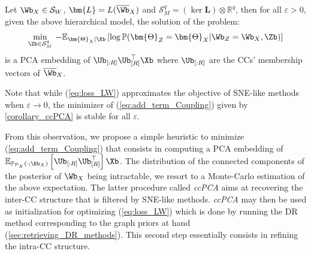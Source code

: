 
\begin{corollary}\label{corollary_ccPCA}
Let $\Wb_{X} \in \mathcal{S}_{W}$, $\bm{L} = L(\overline{\Wb}_{X})$ and $\mathcal{S}^q_{M}= (\ker \bm{L}) \otimes \mathbb{R}^q$, then for all $\varepsilon > 0$, given the above hierarchical model, the solution of the problem:
$$\min_{\Zb \in \mathcal{S}^q_{M}} \: -\mathbb{E}_{\bm{\Theta}_{X}| \Xb}\left[ \log \mathbb{P}(\bm{\Theta}_{Z} = \bm{\Theta}_{X}| \Wb_{Z} = \Wb_{X}, \Zb) \right]$$
is a PCA embedding of $\Ub_{[:R]}\Ub_{[R]}^\top\Xb$ where $\Ub_{[:R]}$ are the CCs' membership vectors of $\overline{\Wb}_{X}$.
\end{corollary}

\begin{remark}
Note that while (\ref{eq:loss_LW}) approximates the objective of SNE-like methods when $\varepsilon \to 0$, the minimizer of (\ref{eq:add_term_Coupling}) given by \cref{corollary_ccPCA} is stable for all $\varepsilon$.
\end{remark}

From this observation, we propose a simple heuristic to minimize (\ref{eq:add_term_Coupling}) that consists in computing a PCA embedding of $\mathbb{E}_{\mathbb{P}_{\mathcal{P}_X}(\cdot;\Kb_{X})}\left[ \Ub_{[:R]}\Ub_{[R]}^\top \right]\Xb$. The distribution of the connected components of the posterior of $\Wb_{X}$ being intractable, we resort to a Monte-Carlo estimation of the above expectation. The latter procedure called \textit{ccPCA} aims at recovering the inter-CC structure that is filtered by SNE-like methods. \textit{ccPCA} may then be used as initialization for optimizing (\ref{eq:loss_LW}) which is done by running the DR method corresponding to the graph priors at hand (\cref{sec:retrieving_DR_methods}). This second step essentially consists in refining the intra-CC structure. 

